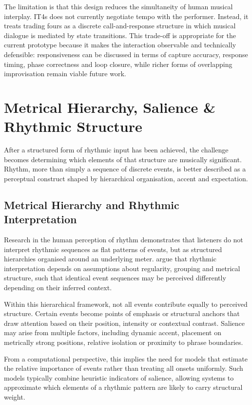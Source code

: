 The limitation is that this design reduces the simultaneity of human
musical interplay. IT4s does not currently negotiate tempo with the
performer. Instead, it treats trading fours as a discrete
call-and-response structure in which musical dialogue is mediated by
state transitions. This trade-off is appropriate for the current
prototype because it makes the interaction observable and technically
defensible: responsiveness can be discussed in terms of capture
accuracy, response timing, phase correctness and loop closure, while
richer forms of overlapping improvisation remain viable future work.

\section{Metrical Hierarchy, Salience \& Rhythmic Structure}\label{metrical-hierarchy-salience-rhythmic-structure}

After a structured form of rhythmic input has been achieved, the
challenge becomes determining which elements of that structure are
musically significant. Rhythm, more than simply a sequence of discrete
events, is better described as a perceptual construct shaped by
hierarchical organisation, accent and expectation.

\subsection{Metrical Hierarchy and Rhythmic Interpretation}\label{metrical-hierarchy-and-rhythmic-interpretation}

Research in the human perception of rhythm demonstrates that listeners
do not interpret rhythmic sequences as flat patterns of events, but as
structured hierarchies organised around an underlying meter.
\citet{longuetHiggins1984rhythmic} argue that rhythmic interpretation
depends on assumptions about regularity, grouping and metrical
structure, such that identical event sequences may be perceived
differently depending on their inferred context.

Within this hierarchical framework, not all events contribute equally to
perceived structure. Certain events become points of emphasis or
structural anchors that draw attention based on their position,
intensity or contextual contrast. Salience may arise from multiple
factors, including dynamic accent, placement on metrically strong
positions, relative isolation or proximity to phrase boundaries.

From a computational perspective, this implies the need for models that
estimate the relative importance of events rather than treating all
onsets uniformly. Such models typically combine heuristic indicators of
salience, allowing systems to approximate which elements of a rhythmic
pattern are likely to carry structural weight.


